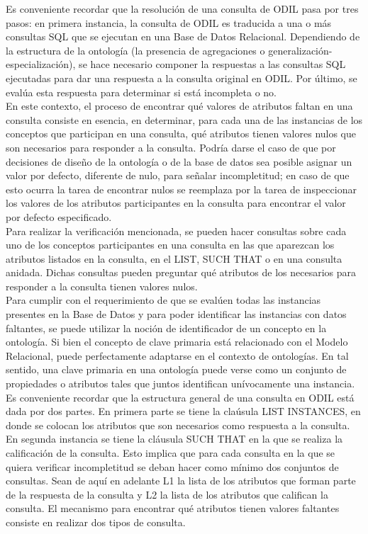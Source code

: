Es conveniente recordar que la resolución de una consulta de ODIL pasa por tres pasos: en primera instancia, la consulta de ODIL es traducida a una o más consultas SQL que se ejecutan en una Base de Datos Relacional. Dependiendo de la estructura de la ontología (la presencia de agregaciones o generalización-especialización), se hace necesario componer la respuestas a las consultas SQL ejecutadas para dar una respuesta a la consulta original en ODIL. Por último, se evalúa esta respuesta para determinar si está incompleta o no. \\

En este contexto, el proceso de encontrar qué valores de atributos faltan en una consulta consiste en esencia, en determinar, para cada una de las instancias de los conceptos que participan en una consulta, qué atributos tienen valores nulos que son necesarios para responder a la consulta. Podría darse el caso de que por decisiones de diseño de la ontología o de la base de datos sea posible asignar un valor por defecto, diferente de nulo, para señalar incompletitud; en caso de que esto ocurra la tarea de encontrar nulos se reemplaza por la tarea de inspeccionar los valores de los atributos participantes en la consulta para encontrar el valor por defecto especificado. \\

Para realizar la verificación mencionada, se pueden hacer consultas sobre cada uno de los conceptos participantes en una consulta en las que aparezcan los atributos listados en la consulta, en el LIST, SUCH THAT o en una consulta anidada. Dichas consultas pueden preguntar qué atributos de los necesarios para responder a la consulta tienen valores nulos.\\

Para cumplir con el requerimiento de que se evalúen todas las instancias presentes en la Base de Datos y para poder identificar las instancias con datos faltantes, se puede utilizar la noción de identificador de un concepto en la ontología. Si bien el concepto de clave primaria está relacionado con el Modelo Relacional, puede perfectamente adaptarse en el contexto de ontologías. En tal sentido, una clave primaria en una ontología puede verse como un conjunto de propiedades o atributos tales que juntos identifican unívocamente una instancia. \\

Es conveniente recordar que la estructura general de una consulta en ODIL está dada por dos partes. En primera parte se tiene la claúsula LIST INSTANCES, en donde se colocan los atributos que son necesarios como respuesta a la consulta. En segunda instancia se tiene la cláusula SUCH THAT en la que se realiza la calificación de la consulta. Esto implica que para cada consulta en la que se quiera verificar incompletitud se deban hacer como mínimo dos conjuntos de consultas. Sean de aquí en adelante L1 la lista de los atributos que forman parte de la respuesta de la consulta y L2 la lista de los atributos que califican la consulta. El mecanismo para encontrar qué atributos tienen valores faltantes consiste en realizar dos tipos de consulta. \\


